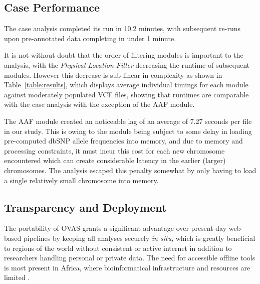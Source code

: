 \documentclass[twocolumn]{bmcart}%
\def\app{OVAS}
\begin{document}
\subsection{Case Performance}

The case analysis completed its run in 10.2 minutes, with subsequent re-runs upon pre-annotated data completing in under 1 minute. 

It is not without doubt that the order of filtering modules is important to the analysis, with the \textit{Physical Location Filter} decreasing the runtime of subsequent modules. However this decrease is sub-linear in complexity as shown in Table~\ref{table:results}, which displays average individual timings for each module against moderately populated VCF files, showing that runtimes are comparable with the case analysis with the exception of the AAF module.

The AAF module created an noticeable lag of an average of 7.27 seconds per file in our study. This is owing to the module being subject to some delay in loading pre-computed dbSNP allele frequencies into memory, and due to memory and processing constraints, it must incur this cost for each new chromosome encountered which can create considerable latency in the earlier (larger) chromosomes. The analysis escaped this penalty somewhat by only having to load a single relatively small chromosome into memory.



\enlargethispage{0.4cm}
\subsection{Transparency and Deployment}

The portability of \app{} grants a significant advantage over present-day web-based pipelines by keeping all analyses securely \textit{in situ}, which is greatly beneficial to regions of the world without consistent or active internet in addition to researchers handling personal or private data. The need for accessible offline tools is most present in Africa, where bioinformatical infrastructure and resources are limited \cite{h3africa2014enabling}.
\end{document}
